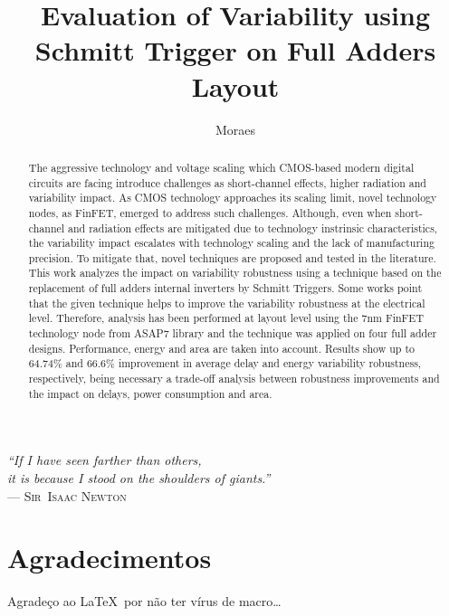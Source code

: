 \documentclass[ecp,tc, english]{iiufrgs}
\title{Evaluation of Variability using Schmitt Trigger on Full Adders Layout}
\author{Moraes}{Leonardo Barlette de}
\begin{document}
\maketitle

\clearpage
\begin{flushright}
\mbox{}\vfill
{\sffamily\itshape
``If I have seen farther than others,\\
it is because I stood on the shoulders of giants.''\\}
--- \textsc{Sir~Isaac Newton}
\end{flushright}

\chapter*{Agradecimentos}
Agradeço ao \LaTeX\ por não ter vírus de macro\ldots



\begin{abstract}
    The aggressive technology and voltage scaling which CMOS-based modern digital circuits are facing introduce challenges as short-channel effects, higher radiation and variability impact. As CMOS technology approaches its scaling limit, novel technology nodes, as FinFET, emerged to address such challenges. Although, even when short-channel and radiation effects are mitigated due to technology instrinsic characteristics, the variability impact escalates with technology scaling and the lack of manufacturing precision. To mitigate that, novel techniques are proposed and tested in the literature. This work analyzes the impact on variability robustness using a technique based on the replacement of full adders internal inverters by Schmitt Triggers. Some works point that the given technique helps to improve the variability robustness at the electrical level. Therefore, analysis has been performed at layout level using the 7nm FinFET technology node from ASAP7 library and the technique was applied on four full adder designs. Performance, energy and area are taken into account. Results show up to 64.74\% and 66.6\% improvement in average delay and energy variability robustness, respectively, being necessary a trade-off analysis between robustness improvements and the impact on delays, power consumption and area. 
\end{abstract}
\end{document}
